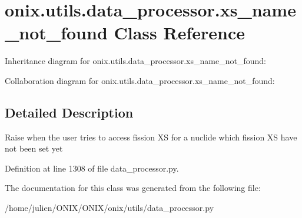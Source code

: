 \hypertarget{classonix_1_1utils_1_1data__processor_1_1xs__name__not__found}{}\section{onix.\+utils.\+data\+\_\+processor.\+xs\+\_\+name\+\_\+not\+\_\+found Class Reference}
\label{classonix_1_1utils_1_1data__processor_1_1xs__name__not__found}


Inheritance diagram for onix.\+utils.\+data\+\_\+processor.\+xs\+\_\+name\+\_\+not\+\_\+found\+:


Collaboration diagram for onix.\+utils.\+data\+\_\+processor.\+xs\+\_\+name\+\_\+not\+\_\+found\+:


\subsection{Detailed Description}
\begin{DoxyVerb}Raise when the user tries to access fission XS for a nuclide which fission XS have not been set yet \end{DoxyVerb}
 

Definition at line 1308 of file data\+\_\+processor.\+py.



The documentation for this class was generated from the following file\+:\begin{DoxyCompactItemize}
\item 
/home/julien/\+O\+N\+I\+X/\+O\+N\+I\+X/onix/utils/data\+\_\+processor.\+py\end{DoxyCompactItemize}
